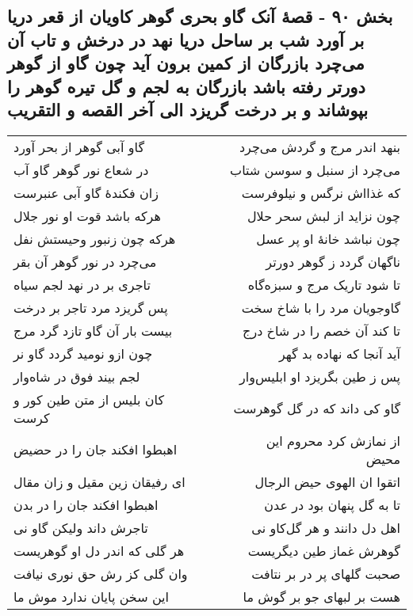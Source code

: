 \begin{center}
\section*{بخش ۹۰ - قصهٔ آنک گاو بحری گوهر کاویان از قعر دریا بر آورد شب بر ساحل دریا نهد در درخش و تاب آن می‌چرد بازرگان از کمین برون آید چون گاو از گوهر دورتر رفته باشد بازرگان به لجم و گل تیره گوهر را بپوشاند و بر درخت گریزد الی آخر القصه و التقریب}
\label{sec:sh090}
\begin{longtable}{l p{0.5cm} r}
گاو آبی گوهر از بحر آورد
&&
بنهد اندر مرج و گردش می‌چرد
\\
در شعاع نور گوهر گاو آب
&&
می‌چرد از سنبل و سوسن شتاب
\\
زان فکندهٔ گاو آبی عنبرست
&&
که غذااش نرگس و نیلوفرست
\\
هرکه باشد قوت او نور جلال
&&
چون نزاید از لبش سحر حلال
\\
هرکه چون زنبور وحیستش نفل
&&
چون نباشد خانهٔ او پر عسل
\\
می‌چرد در نور گوهر آن بقر
&&
ناگهان گردد ز گوهر دورتر
\\
تاجری بر در نهد لجم سیاه
&&
تا شود تاریک مرج و سبزه‌گاه
\\
پس گریزد مرد تاجر بر درخت
&&
گاوجویان مرد را با شاخ سخت
\\
بیست بار آن گاو تازد گرد مرج
&&
تا کند آن خصم را در شاخ درج
\\
چون ازو نومید گردد گاو نر
&&
آید آنجا که نهاده بد گهر
\\
لجم بیند فوق در شاه‌وار
&&
پس ز طین بگریزد او ابلیس‌وار
\\
کان بلیس از متن طین کور و کرست
&&
گاو کی داند که در گل گوهرست
\\
اهبطوا افکند جان را در حضیض
&&
از نمازش کرد محروم این محیض
\\
ای رفیقان زین مقیل و زان مقال
&&
اتقوا ان الهوی حیض الرجال
\\
اهبطوا افکند جان را در بدن
&&
تا به گل پنهان بود در عدن
\\
تاجرش داند ولیکن گاو نی
&&
اهل دل دانند و هر گل‌کاو نی
\\
هر گلی که اندر دل او گوهریست
&&
گوهرش غماز طین دیگریست
\\
وان گلی کز رش حق نوری نیافت
&&
صحبت گلهای پر در بر نتافت
\\
این سخن پایان ندارد موش ما
&&
هست بر لبهای جو بر گوش ما
\\
\end{longtable}
\end{center}
